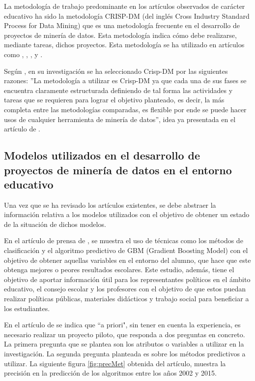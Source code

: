 La metodología de trabajo predominante en los artículos observados de carácter educativo ha sido la metodología CRISP-DM (del inglés Cross Industry Standard Process for Data Mining) que es una metodología frecuente en el desarrollo de proyectos de minería de datos. Esta metodología indica cómo debe realizarse, mediante tareas, dichos proyectos. Esta metodología se ha utilizado en artículos como , , ,  y .

Según , en su investigación se ha seleccionado Crisp-DM por las siguientes razones: ''La metodología a utilizar es Crisp-DM ya que cada una de sus fases se encuentra claramente estructurada definiendo de tal forma las actividades y tareas que se requieren para lograr el objetivo planteado, es decir, la más completa entre las metodologías comparadas, es flexible por ende se puede hacer usos de cualquier herramienta de minería de datos'', idea ya presentada en el artículo de \cite{moine2011analisis}.

\subsection{Modelos utilizados en el desarrollo de proyectos de minería de datos en el entorno educativo}
Una vez que se ha revisado los artículos existentes, se debe abstraer la información relativa a los modelos utilizados con el objetivo de obtener un estado de la situación de dichos modelos.

En el artículo de prensa de , se muestra el uso de técnicas como los métodos de clasificación y el algoritmo predictivo de GBM (Gradient Boosting Model) con el objetivo de obtener aquellas variables en el entorno del alumno, que hace que este obtenga mejores o peores resultados escolares. Este estudio, además, tiene el objetivo de aportar información útil para los representantes políticos en el ámbito educativo, el consejo escolar y los profesores con el objetivo de que estos puedan realizar políticas públicas, materiales didácticos y trabajo social para beneficiar a los estudiantes.

En el artículo de  se indica que ``a priori", sin tener en cuenta la experiencia, es necesario realizar un proyecto piloto, que responda a dos preguntas en concreto. La primera pregunta que se plantea son los atributos o variables a utilizar en la investigación. La segunda pregunta planteada es sobre los métodos predictivos a utilizar. La siguiente figura \ref{fig:precMet} obtenida del artículo, muestra la precisión en la predicción de los algoritmos entre los años 2002 y 2015.

